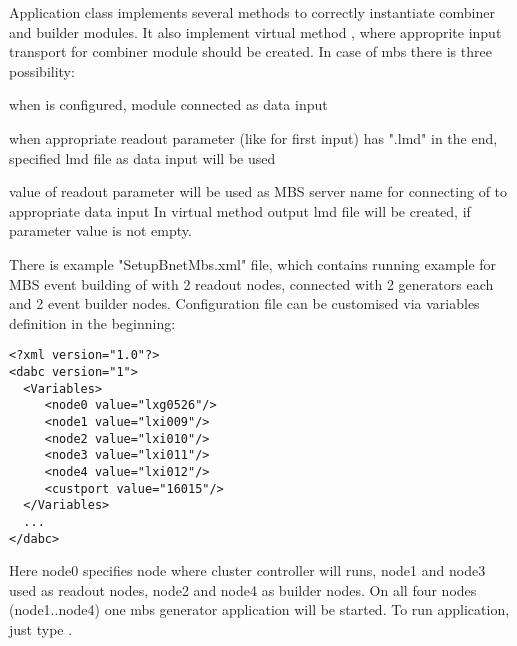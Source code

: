 Application class  implements several methods to
correctly instantiate combiner and builder modules.
It also implement virtual method , where approprite input transport 
for combiner module should be created. In case of mbs there is three possibility:
\bnum
\item when  is configured, module  connected as data input 
\item when appropriate readout parameter (like  for first input) has 
      ".lmd" in the end, specified lmd file as data input will be used
\item value of readout parameter  will be used as MBS server name for
      connecting of  to appropriate data input         
\enum
In virtual method  output lmd file will be created, if 
parameter  value is not empty.

There is example "SetupBnetMbs.xml" file, which contains running example for 
MBS event building of with 2 readout nodes, connected with 2 generators each and 
2 event builder nodes. Configuration file can be customised via variables definition in the beginning:
\begin{small}
\begin{verbatim}
<?xml version="1.0"?>
<dabc version="1">
  <Variables>
     <node0 value="lxg0526"/>
     <node1 value="lxi009"/>
     <node2 value="lxi010"/>
     <node3 value="lxi011"/>
     <node4 value="lxi012"/>
     <custport value="16015"/>
  </Variables>
  ...
</dabc>
\end{verbatim}
\end{small}

Here node0 specifies node where cluster controller will runs, node1 and node3 used as readout nodes,
node2 and node4 as builder nodes. On all four nodes (node1..node4) one mbs generator
application will be started. To run application, just type .  
